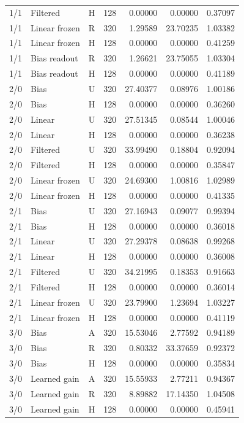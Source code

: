 \begin{longtable}{rlllrrr}
1/1 & Filtered & H & 128 & 0.00000 & 0.00000 & 0.37097 \\
1/1 & Linear frozen & R & 320 & 1.29589 & 23.70235 & 1.03382 \\
1/1 & Linear frozen & H & 128 & 0.00000 & 0.00000 & 0.41259 \\
1/1 & Bias readout & R & 320 & 1.26621 & 23.75055 & 1.03304 \\
1/1 & Bias readout & H & 128 & 0.00000 & 0.00000 & 0.41189 \\
2/0 & Bias & U & 320 & 27.40377 & 0.08976 & 1.00186 \\
2/0 & Bias & H & 128 & 0.00000 & 0.00000 & 0.36260 \\
2/0 & Linear & U & 320 & 27.51345 & 0.08544 & 1.00046 \\
2/0 & Linear & H & 128 & 0.00000 & 0.00000 & 0.36238 \\
2/0 & Filtered & U & 320 & 33.99490 & 0.18804 & 0.92094 \\
2/0 & Filtered & H & 128 & 0.00000 & 0.00000 & 0.35847 \\
2/0 & Linear frozen & U & 320 & 24.69300 & 1.00816 & 1.02989 \\
2/0 & Linear frozen & H & 128 & 0.00000 & 0.00000 & 0.41335 \\
2/1 & Bias & U & 320 & 27.16943 & 0.09077 & 0.99394 \\
2/1 & Bias & H & 128 & 0.00000 & 0.00000 & 0.36018 \\
2/1 & Linear & U & 320 & 27.29378 & 0.08638 & 0.99268 \\
2/1 & Linear & H & 128 & 0.00000 & 0.00000 & 0.36008 \\
2/1 & Filtered & U & 320 & 34.21995 & 0.18353 & 0.91663 \\
2/1 & Filtered & H & 128 & 0.00000 & 0.00000 & 0.36014 \\
2/1 & Linear frozen & U & 320 & 23.79900 & 1.23694 & 1.03227 \\
2/1 & Linear frozen & H & 128 & 0.00000 & 0.00000 & 0.41119 \\
3/0 & Bias & A & 320 & 15.53046 & 2.77592 & 0.94189 \\
3/0 & Bias & R & 320 & 0.80332 & 33.37659 & 0.92372 \\
3/0 & Bias & H & 128 & 0.00000 & 0.00000 & 0.35834 \\
3/0 & Learned gain & A & 320 & 15.55933 & 2.77211 & 0.94367 \\
3/0 & Learned gain & R & 320 & 8.89882 & 17.14350 & 1.04508 \\
3/0 & Learned gain & H & 128 & 0.00000 & 0.00000 & 0.45941 \\

\end{longtable}
